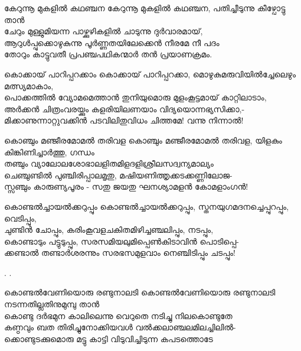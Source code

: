 \begin{enumerate}

\begin{slokam}{\VSv}{\VNM}{കേറുന്നൂ മുകളിൽ കഥഞ്ചന}
കേറുന്നൂ മുകളിൽ കഥഞ്ചന, പതിച്ചീടുന്നു കീഴ്പോട്ടു താൻ\\
ചേറും മുള്ളുമിയന്ന പാഴ്ക്കുഴികളിൽ ചാടുന്നു ദുർവാരമായ്,\\
ആറുൾപ്പുക്കൊഴുകുന്നു പൂർണ്ണതയിലേക്കെൻ നീരമേ നീ പദം\\
തോറും കാട്ടുവതീ പ്രപഞ്ചപഥികന്മാർ തൻ പ്രയാണക്രമം. 
\end{slokam}


\begin{slokam}{\VSr}{\HM}{കൊക്കായ് പാറിപ്പറക്കാം}
കൊക്കായ് പാറിപ്പറക്കാ, മൊഴുകുമരുവിയിൽച്ചേലെഴും മത്സ്യമാകാം,\\
പൊക്കത്തിൽ വ്യോമമെത്താൻ തുനിയുമൊരു മുളംകൂട്ടമായ് കാറ്റിലാടാം,\\
അർക്കൻ ചിത്രംവരയ്ക്കും കളരിയിലണയാം വിദ്യയൊന്നഭ്യസിക്കാ,-\\
മിക്കാണുന്നാറ്റുവക്കിൻ പടവിലിതുവിധം ചിത്തമേ! വന്നു നിന്നാൽ!
\end{slokam}


\begin{slokam}{\VSr}{\KND}{കൊഞ്ചും മഞ്ജീരമോമൽ തരിവള}
കൊഞ്ചും മഞ്ജീരമോമൽ തരിവള, യിളകും കിങ്കിണിച്ചാർത്തു, ഗന്ധം\\
തഞ്ചും വ്യാലോലശോഭാലളിതമിളദളിശ്രീലസദ്വന്യമാല്യം\\
ചെഞ്ചുണ്ടിൽ പുഞ്ചിരിപ്പാലമൃതു, മഷിയണിത്തൃക്കടക്കണ്ണിലോജ-\\
സ്സഞ്ചും കാരുണ്യപൂരം - സതു ജയതു ഘനശ്യാമളൻ കോമളാംഗൻ!
\end{slokam}





\begin{slokam}{\VSr}{\VKG}{കൊണ്ടൽച്ചായൽക്കറുപ്പും}
 കൊണ്ടൽച്ചായൽക്കറുപ്പും, സ്തനയുഗമദനച്ചെപ്പുറപ്പും, വെടിപ്പും,\\
ചുണ്ടിൻ ചോപ്പും, കരിംകൂവളചകിതമിഴിച്ചഞ്ചലിപ്പും, നടപ്പും,\\
കൊണ്ടാടും പട്ടുടുപ്പും, സരസമിയലുമിപ്പെൺകിടാവിൻ പൊടിപ്പെ-\\
ക്കണ്ടാൽ തണ്ടാർശരന്നും സരഭസമുളവാം നെഞ്ചിടിപ്പും ചടപ്പും!
\end{slokam}


.  .


\begin{slokam}{\VKm}{\ARRV}{കൊണ്ടല്‍വേണിയൊരു രണ്ടുനാലടി}
 കൊണ്ടല്‍വേണിയൊരു രണ്ടുനാലടി നടന്നതില്ലതിനുമുമ്പു താന്‍\\
കൊണ്ടു ദര്‍ഭമുന കാലിലെന്നു വെറുതെ നടിച്ചു നിലകൊണ്ടുതേ\\
കണ്ഠവും ബത തിരിച്ചുനോക്കിയവള്‍ വല്‍ക്കലാഞ്ചലമിലച്ചിലില്‍-\\
ക്കൊണ്ടുടക്കുമൊരു മട്ടു കാട്ടി വിടുവിച്ചിടുന്ന കപടത്തൊടേ
\end{slokam}


\end{enumerate}
